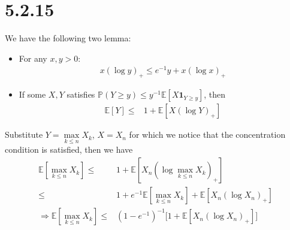 \documentclass[11pt,a4paper]{ctexart}
\numberwithin{equation}{section}%
\begin{document}
\section{5.2.15}

We have the following two lemma:
\begin{itemize}[topsep=2pt,itemsep=0pt]
    \item For any $ x,y>0 $:
    \begin{align*}
         x(\log y)_+\leq e^{-1}y+ x(\log x)_+
    \end{align*}
    \item If some $ X,Y $ satisfies $ \mathbb{P}\left( Y\geq y \right) \leq y^{-1}\mathbb{E}\left[ X\mathbf{1}_{Y\geq y} \right] $, then
    \begin{align*}
        \mathbb{E}\left[ Y \right] \leq & 1+ \mathbb{E}\left[ X(\log Y)_+ \right]  
    \end{align*}
\end{itemize}

Substitute $ Y = \mathop{ \max }\limits_{k\leq n}X_k  $, $ X = X_n $ for which we notice that the concentration condition is satisfied, then we have
\begin{align*}
    \mathbb{E}\left[ \mathop{ \max }\limits_{k\leq n}X_k \right] \leq& 1+ \mathbb{E}\left[ X_n(\log \mathop{ \max }\limits_{k\leq n}X_k)_+ \right]\\
    \leq& 1+ e^{-1}\mathbb{E}\left[ \mathop{ \max }\limits_{k\leq n}X_k \right] + \mathbb{E}\left[ X_n(\log X_n)_+ \right]\\
     \Rightarrow \mathbb{E}\left[ \mathop{ \max }\limits_{k\leq n}X_k \right]\leq& (1-e^{-1})^{-1}\big[ 1+ \mathbb{E}\left[ X_n(\log X_n)_+ \right] \big]
\end{align*}



    























 


    


    








    
\end{document}
